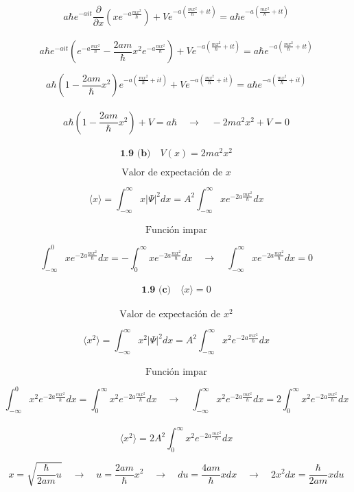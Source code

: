 \documentclass[10pt,a4papper]{article}
\begin{document}
\[a\hbar e^{-ait}\frac{\partial}{\partial x}\left(xe^{-a\frac{mx^2}{\hbar}}\right)
+Ve^{-a\left(\frac{mx^2}{\hbar}+it\right)}=
a\hbar e^{-a\left(\frac{mx^2}{\hbar}+it\right)}\]\\

\[a\hbar e^{-ait}\left(e^{-a\frac{mx^2}{\hbar}}-\frac{2am}{\hbar}x^2e^{-a\frac{mx^2}{\hbar}}\right)
+Ve^{-a\left(\frac{mx^2}{\hbar}+it\right)}=
a\hbar e^{-a\left(\frac{mx^2}{\hbar}+it\right)}\]

\newpage
\[a\hbar\left(1-\frac{2am}{\hbar}x^2\right)e^{-a\left(\frac{mx^2}{\hbar}+it\right)}
+Ve^{-a\left(\frac{mx^2}{\hbar}+it\right)}=
a\hbar e^{-a\left(\frac{mx^2}{\hbar}+it\right)}\]\\

\[a\hbar\left(1-\frac{2am}{\hbar}x^2\right)+V=a\hbar\quad\to\quad -2ma^2x^2+V=0\]\\

\[\boxed{\textbf{1.9 (b)}\quad V(x)=2ma^2x^2}\]

\newpage
\[\text{Valor de expectación de }x\]

\[\langle x\rangle=\int_{-\infty}^\infty x|\Psi|^2dx=A^2\int_{-\infty}^\infty xe^{-2a\frac{mx^2}{\hbar}}dx\]\\

\[\text{Función impar}\]

\[\int_{-\infty}^0 xe^{-2a\frac{mx^2}{\hbar}}dx=-\int_0^\infty xe^{-2a\frac{mx^2}{\hbar}}dx\quad\to\quad
\int_{-\infty}^\infty xe^{-2a\frac{mx^2}{\hbar}}dx=0\]\\

\[\boxed{\textbf{1.9 (c)}\quad\langle x\rangle=0}\]\\

\[\text{Valor de expectación de }x^2\]

\[\langle x^2\rangle=\int_{-\infty}^\infty x^2|\Psi|^2dx=A^2\int_{-\infty}^\infty x^2e^{-2a\frac{mx^2}{\hbar}}dx\]\\

\[\text{Función impar}\]

\[\int_{-\infty}^0 x^2e^{-2a\frac{mx^2}{\hbar}}dx=\int_0^\infty x^2e^{-2a\frac{mx^2}{\hbar}}dx\quad\to\quad
\int_{-\infty}^\infty x^2e^{-2a\frac{mx^2}{\hbar}}dx=2\int_0^\infty x^2e^{-2a\frac{mx^2}{\hbar}}dx\]\\

\[\langle x^2\rangle=2A^2\int_0^\infty x^2e^{-2a\frac{mx^2}{\hbar}}dx\]

\newpage
\[x=\sqrt{\frac{\hbar}{2am}u}\quad\to\quad u=\frac{2am}{\hbar}x^2\quad\to\quad du=\frac{4am}{\hbar}xdx\quad\to\quad 2x^2dx=\frac{\hbar}{2am}xdu\]
\end{document}
